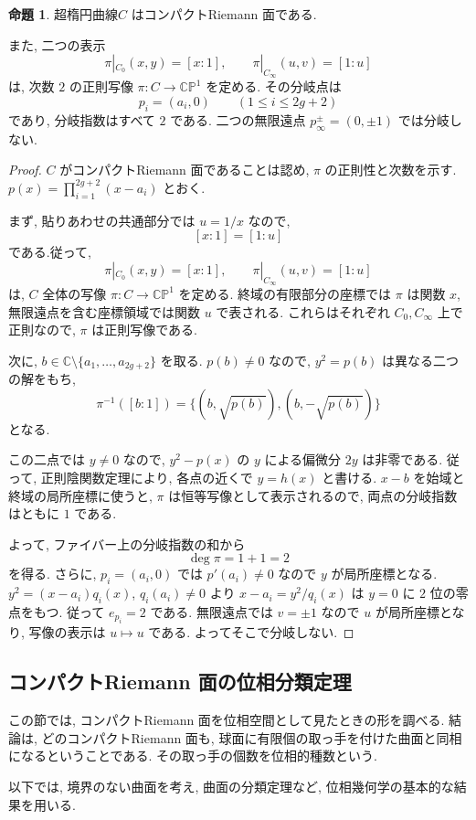 \documentclass[dvipdfmx,a4paper,11pt]{article} %
\newcommand{\C}{\mathbb{C}}
\theoremstyle{definition}
\numberwithin{equation}{section}
\newtheorem{prop}[thm]{命題}
\begin{document}
\begin{prop}
超楕円曲線$C$ はコンパクトRiemann 面である.

また, 二つの表示
\[
\pi|_{C_0}(x,y)=[x:1],\qquad
\pi|_{C_\infty}(u,v)=[1:u]
\]
は, 次数 $2$ の正則写像
$\pi:C\to\C\mathbb P^1$ を定める.
その分岐点は
\[
p_i=(a_i,0)\qquad(1\leq i\leq2g+2)
\]
であり, 分岐指数はすべて $2$ である.
二つの無限遠点 $p_\infty^\pm=(0,\pm1)$ では分岐しない.
\end{prop}
\begin{proof}
$C$ がコンパクトRiemann 面であることは認め, 
$\pi$ の正則性と次数を示す.
$p(x)=\prod_{i=1}^{2g+2}(x-a_i)$ とおく.

まず, 貼りあわせの共通部分では $u=1/x$ なので, 
\[
[x:1]=[1:u]
\]
である.従って, 
\[
\pi|_{C_0}(x,y)=[x:1],\qquad
\pi|_{C_\infty}(u,v)=[1:u]
\]
は, $C$ 全体の写像 $\pi:C\to\C\mathbb P^1$ を定める.
終域の有限部分の座標では $\pi$ は関数 $x$, 
無限遠点を含む座標領域では関数 $u$ で表される.
これらはそれぞれ $C_0,C_\infty$ 上で正則なので, 
$\pi$ は正則写像である.

次に, $b\in\C\setminus\{a_1,\ldots,a_{2g+2}\}$ を取る.
$p(b)\neq0$ なので, $y^2=p(b)$ は異なる二つの解をもち, 
\[
\pi^{-1}([b:1])
=\{(b,\sqrt{p(b)}),(b,-\sqrt{p(b)})\}
\]
となる.

この二点では $y\neq0$ なので, 
$y^2-p(x)$ の $y$ による偏微分 $2y$ は非零である.
従って, 正則陰関数定理により, 各点の近くで $y=h(x)$ と書ける.
$x-b$ を始域と終域の局所座標に使うと, 
$\pi$ は恒等写像として表示されるので, 
両点の分岐指数はともに $1$ である.

よって, ファイバー上の分岐指数の和から
\[
\deg\pi=1+1=2
\]
を得る.
さらに, $p_i=(a_i,0)$ では $p'(a_i)\neq0$ なので $y$ が局所座標となる.
$y^2=(x-a_i)q_i(x)$, $q_i(a_i)\neq0$ より
$x-a_i=y^2/q_i(x)$ は $y=0$ に $2$ 位の零点をもつ.
従って $e_{p_i}=2$ である.
無限遠点では $v=\pm1$ なので $u$ が局所座標となり,
写像の表示は $u\mapsto u$ である. よってそこで分岐しない.
\end{proof}


\subsection{コンパクトRiemann 面の位相分類定理}\label{O-S031}

この節では, コンパクトRiemann 面を位相空間として見たときの形を調べる.
結論は, どのコンパクトRiemann 面も, 
球面に有限個の取っ手を付けた曲面と同相になるということである.
その取っ手の個数を位相的種数という.

以下では, 境界のない曲面を考え, 
曲面の分類定理など, 位相幾何学の基本的な結果を用いる.
\end{document}
